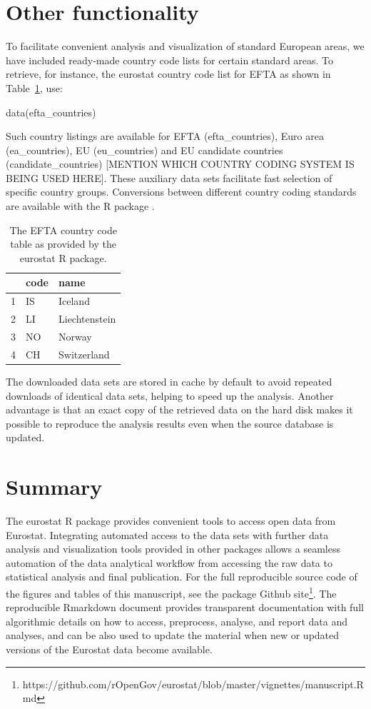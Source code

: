 \section{Other functionality}

To facilitate convenient analysis and visualization of standard
European areas, we have included ready-made country code lists for
certain standard areas. To retrieve, for instance, the eurostat
country code list for EFTA as shown in Table~\ref{tab:efta}, use:

\begin{example}
data(efta_countries)
\end{example}

Such country listings are available for EFTA (efta\_countries), Euro
area (ea\_countries), EU (eu\_countries) and EU candidate countries
(candidate\_countries) [MENTION WHICH COUNTRY CODING SYSTEM IS BEING
USED HERE]. These auxiliary data sets facilitate fast selection of
specific country groups. Conversions between different country coding
standards are available with the  R
package \citep{countrycode}.


\begin{table}[ht]
\centering
\begin{tabular}{rll}
\toprule
  \hline
  & code & name \\ 
  \hline
  1 & IS & Iceland \\ 
  2 & LI & Liechtenstein \\ 
  3 & NO & Norway \\ 
  4 & CH & Switzerland \\ 
   \hline
\bottomrule   
\end{tabular}
\label{tab:efta}
\caption{The EFTA country code table as provided by the eurostat R package.}
\end{table}

The downloaded data sets are stored in cache by default to avoid
repeated downloads of identical data sets, helping to speed up the
analysis. Another advantage is that an exact copy of the retrieved
data on the hard disk makes it possible to reproduce the analysis
results even when the source database is updated.


\section{Summary}

The eurostat R package provides convenient tools to access open data
from Eurostat. Integrating automated access to the data sets with
further data analysis and visualization tools provided in other
packages allows a seamless automation of the data analytical workflow
from accessing the raw data to statistical analysis and final
publication. For the full reproducible source code of the figures and
tables of this manuscript, see the package Github
site\footnote{https://github.com/rOpenGov/eurostat/blob/master/vignettes/manuscript.Rmd}. The
reproducible Rmarkdown document provides transparent documentation
with full algorithmic details on how to access, preprocess, analyse,
and report data and analyses, and can be also used to update the
material when new or updated versions of the Eurostat data become
available.

